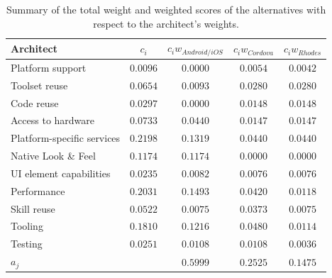 \begin{table}[h]
    \centering
    \begin{tabular}{lcccc}
        \hline
        \textbf{Architect}         & $c_i$    & $c_i w_{Android/iOS}$ & $c_i w_{Cordova}$  & $c_i w_{Rhodes}$ \\
        \hline
        Platform support           & $0.0096$ & $0.0000$              & $0.0054$           & $0.0042$         \\
        Toolset reuse              & $0.0654$ & $0.0093$              & $0.0280$           & $0.0280$         \\
        Code reuse                 & $0.0297$ & $0.0000$              & $0.0148$           & $0.0148$         \\
        Access to hardware         & $0.0733$ & $0.0440$              & $0.0147$           & $0.0147$         \\
        Platform-specific services & $0.2198$ & $0.1319$              & $0.0440$           & $0.0440$         \\
        Native Look \& Feel        & $0.1174$ & $0.1174$              & $0.0000$           & $0.0000$         \\
        UI element capabilities    & $0.0235$ & $0.0082$              & $0.0076$           & $0.0076$         \\
        Performance                & $0.2031$ & $0.1493$              & $0.0420$           & $0.0118$         \\
        Skill reuse                & $0.0522$ & $0.0075$              & $0.0373$           & $0.0075$         \\
        Tooling                    & $0.1810$ & $0.1216$              & $0.0480$           & $0.0114$         \\
        Testing                    & $0.0251$ & $0.0108$              & $0.0108$           & $0.0036$         \\
        \hline
        $a_j$                      &          & $0.5999$              & $0.2525$           & $0.1475$         \\
        \hline
    \end{tabular}
    \caption{Summary of the total weight and weighted scores of the alternatives with respect to the architect's weights.}
    \label{tab:total:architect}
\end{table}


